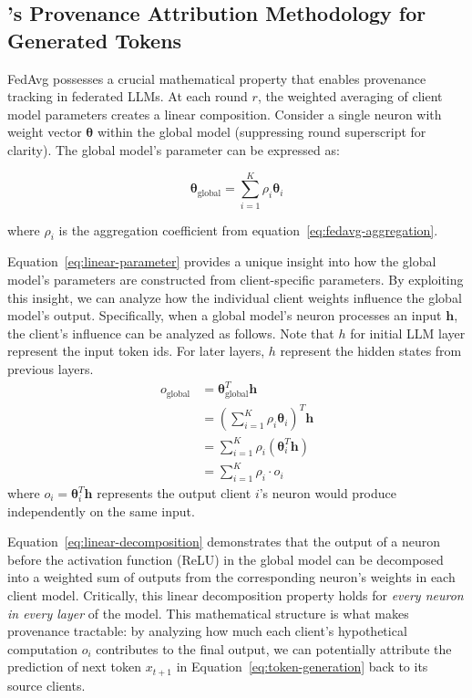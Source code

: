 

\subsection{\tool's Provenance Attribution Methodology for Generated Tokens}

FedAvg possesses a crucial mathematical property that enables provenance tracking in federated LLMs.
At each round $r$, the weighted averaging of client model parameters creates a linear composition.
Consider a single neuron with weight vector $\boldsymbol{\theta}$ within the global model (suppressing round superscript for clarity).
The global model's parameter can be expressed as:

\begin{equation}
  \label{eq:linear-parameter}
  \boldsymbol{\theta}_{\text{global}} = \sum_{i=1}^K \rho_i \boldsymbol{\theta}_i
\end{equation}

where $\rho_i$ is the aggregation coefficient from equation~\ref{eq:fedavg-aggregation}.

Equation~\ref{eq:linear-parameter} provides a unique insight into how the global model's parameters are constructed from client-specific parameters.
By exploiting this insight, we can analyze how the individual client weights influence the global model's output.
Specifically, when a global model's neuron processes an input $\mathbf{h}$, the client's influence can be analyzed as follows.
Note that $h$ for initial LLM layer represent the input token ids. For later layers, $h$ represent the hidden states from previous layers.
\begin{equation}
  \label{eq:linear-decomposition}
  \begin{split}
    o_{\text{global}} &= \boldsymbol{\theta}_{\text{global}}^T \mathbf{h} \\
    &= \left(\sum_{i=1}^K \rho_i \boldsymbol{\theta}_i\right)^T \mathbf{h} \\
    &= \sum_{i=1}^K \rho_i (\boldsymbol{\theta}_i^T \mathbf{h}) \\
    &= \sum_{i=1}^K \rho_i \cdot o_i
  \end{split}
\end{equation}
where $o_i = \boldsymbol{\theta}_i^T \mathbf{h}$ represents the output client $i$'s neuron would produce independently on the same input.

Equation~\ref{eq:linear-decomposition} demonstrates that the output of a neuron before the activation function (\eg ReLU) in the global model can be decomposed into a weighted sum of outputs from the corresponding neuron's weights in each client model.
Critically, this linear decomposition property holds for \emph{every neuron in every layer} of the model.
This mathematical structure is what makes provenance tractable: by analyzing how much each client's hypothetical computation $o_i$ contributes to the final output, we can potentially attribute the prediction of next token $x_{t+1}$ in Equation~\ref{eq:token-generation} back to its source clients.

